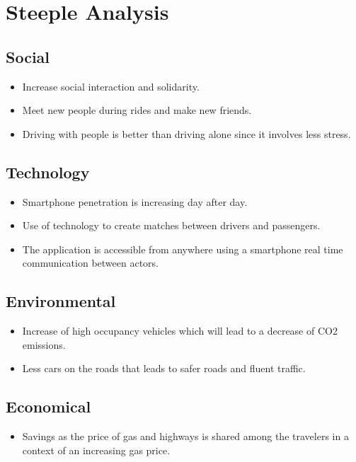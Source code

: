 \chapter{Steeple Analysis} \label{ap:Appendix1}

\section*{Social}
\begin{itemize}
\item Increase social interaction and solidarity.
\item Meet new people during rides and make new friends.
\item Driving with people is better than driving alone since it involves less stress.
\end{itemize}

\section*{Technology}
\begin{itemize}
\item Smartphone penetration is increasing day after day.  
\item  Use of technology to create matches between drivers and passengers.
\item The application is accessible from anywhere using a smartphone  real time communication between actors.
\end{itemize}

\section*{Environmental}
\begin{itemize}
\item Increase of high occupancy vehicles which will lead to a decrease of CO2 emissions.
\item Less cars on the roads that leads to safer roads and fluent traffic. 
\end{itemize}

\section*{Economical}
\begin{itemize}
\item Savings as the price of gas and highways is shared among the travelers in a context of an increasing gas price.
\end{itemize}

